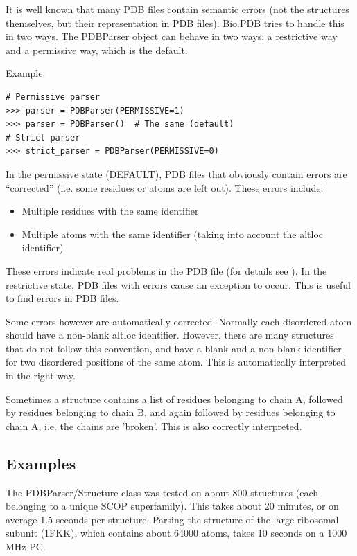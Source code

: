 It is well known that many PDB files contain semantic errors (not the
structures themselves, but their representation in PDB files).
Bio.PDB tries to handle this in two ways. The PDBParser
object can behave in two ways: a restrictive way and a permissive
way, which is the default.

Example:

\begin{verbatim}
# Permissive parser
>>> parser = PDBParser(PERMISSIVE=1)
>>> parser = PDBParser()  # The same (default)
# Strict parser
>>> strict_parser = PDBParser(PERMISSIVE=0)
\end{verbatim}
In the permissive state (DEFAULT), PDB files that obviously contain
errors are ``corrected'' (i.e. some residues or atoms are left out).
These errors include:

\begin{itemize}
\item Multiple residues with the same identifier
\item Multiple atoms with the same identifier (taking into account the altloc
identifier)
\end{itemize}
These errors indicate real problems in the PDB file (for details see
\cite[Hamelryck and Manderick, 2003]{hamelryck2003a}). In the restrictive state, PDB files with errors cause an exception to occur. This is useful to find errors in PDB files.

Some errors however are automatically corrected. Normally each disordered
atom should have a non-blank altloc identifier. However, there are
many structures that do not follow this convention, and have a blank
and a non-blank identifier for two disordered positions of the same
atom. This is automatically interpreted in the right way.

Sometimes a structure contains a list of residues belonging to chain
A, followed by residues belonging to chain B, and again followed by
residues belonging to chain A, i.e. the chains are 'broken'. This
is also correctly interpreted.

\subsection{Examples}
\label{sec:problem_structures}

The PDBParser/Structure class was tested on about 800 structures (each belonging
to a unique SCOP superfamily). This takes about 20 minutes, or on average 1.5
seconds per structure. Parsing the structure of the large ribosomal subunit
(1FKK), which contains about 64000 atoms, takes 10 seconds on a 1000 MHz PC.

